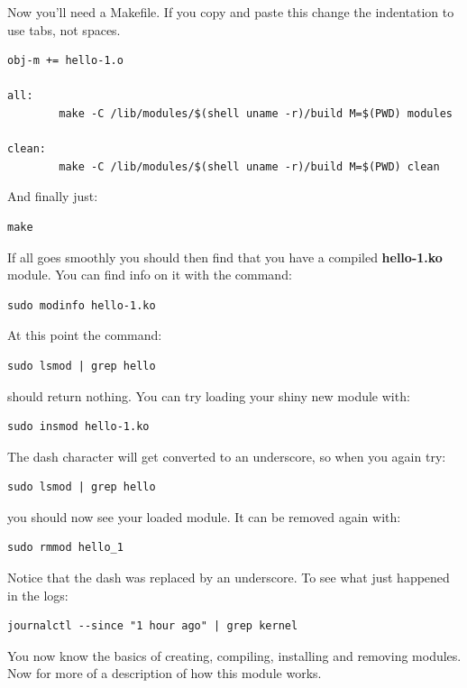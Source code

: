 \documentclass[11pt]{article}
\begin{document}
Now you'll need a Makefile. If you copy and paste this change the indentation to use tabs, not spaces.

\begin{verbatim}
obj-m += hello-1.o

all:
        make -C /lib/modules/$(shell uname -r)/build M=$(PWD) modules

clean:
        make -C /lib/modules/$(shell uname -r)/build M=$(PWD) clean
\end{verbatim}

And finally just:

\begin{verbatim}
make
\end{verbatim}

If all goes smoothly you should then find that you have a compiled \textbf{hello-1.ko} module. You can find info on it with the command:

\begin{verbatim}
sudo modinfo hello-1.ko
\end{verbatim}

At this point the command:

\begin{verbatim}
sudo lsmod | grep hello
\end{verbatim}

should return nothing. You can try loading your shiny new module with:

\begin{verbatim}
sudo insmod hello-1.ko
\end{verbatim}

The dash character will get converted to an underscore, so when you again try:

\begin{verbatim}
sudo lsmod | grep hello
\end{verbatim}

you should now see your loaded module. It can be removed again with:

\begin{verbatim}
sudo rmmod hello_1
\end{verbatim}

Notice that the dash was replaced by an underscore. To see what just happened in the logs:

\begin{verbatim}
journalctl --since "1 hour ago" | grep kernel
\end{verbatim}

You now know the basics of creating, compiling, installing and removing modules. Now for more of a description of how this module works.
\end{document}
